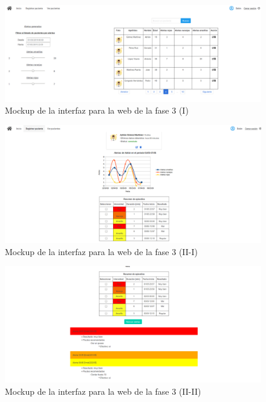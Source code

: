\begin{figure}[!htbp]
    \centering
    \includegraphics[scale=0.24]{Imagenes/anxA17.png}
    \caption[Mockup de la interfaz para la web de la fase 3 (I)]{Mockup de la interfaz para la web de la fase 3 (I)}
    \label{fig:mockup17}
\end{figure}

\begin{figure}[!htbp]
    \centering
    \includegraphics[scale=0.24]{Imagenes/anxA18.png}
    \caption[Mockup de la interfaz para la web de la fase 3 (II-I)]{Mockup de la interfaz para la web de la fase 3 (II-I)}
    \label{fig:mockup18}
\end{figure}

\begin{figure}[!htbp]
    \centering
    \includegraphics[scale=0.24]{Imagenes/anxA19.png}
    \caption[Mockup de la interfaz para la web de la fase 3 (II-II)]{Mockup de la interfaz para la web de la fase 3 (II-II)}
    \label{fig:mockup19}
\end{figure}

